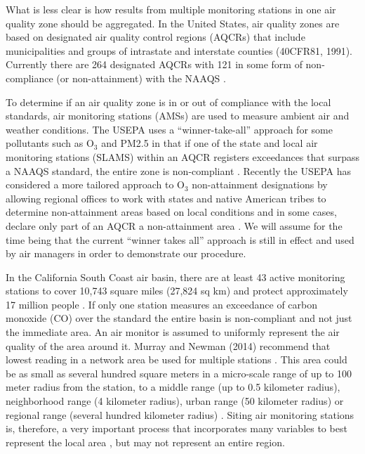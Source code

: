 What is less clear is how results from multiple monitoring stations in one air quality zone should be aggregated. In the United States, air quality zones are based on designated air quality control regions (AQCRs) that include municipalities and groups of intrastate and interstate counties (40CFR81, 1991). Currently there are 264 designated AQCRs with 121 in some form of non-compliance (or non-attainment) with the NAAQS \citep{USEPA2016b}. 

To determine if an air quality zone is in or out of compliance with the local standards, air monitoring stations (AMSs) are used to measure ambient air and weather conditions. The USEPA uses a ``winner-take-all” approach for some pollutants such as O$_{3}$ and PM2.5 in that if one of the state and local air monitoring stations (SLAMS) within an AQCR registers exceedances that surpass a NAAQS standard, the entire zone is non-compliant \citep{USEPA2005a}.  Recently the USEPA has considered a more tailored approach to O$_{3}$ non-attainment designations by allowing regional offices to work with states and native American tribes to determine non-attainment areas based on local conditions and in some cases, declare only part of an AQCR a non-attainment area \citep{McCabe2015}. We will assume for the time being that the current ``winner takes all” approach is still in effect and used by air managers in order to demonstrate our procedure.

In the California South Coast air basin, there are at least 43 active monitoring stations \citep{CARB2013} to cover 10,743 square miles (27,824 sq km) and protect approximately 17 million people \citep{AQMD2010}.  If only one station measures an exceedance of carbon monoxide (CO) over the standard the entire basin is non-compliant and not just the immediate area.  An air monitor is assumed to uniformly represent the air quality of the area around it.  Murray and Newman (2014) recommend that lowest reading in a network area be used for multiple stations \cite{Murray2014}. This area could be as small as several hundred square meters in a micro-scale range of up to 100 meter radius from the station, to a middle range (up to 0.5 kilometer radius), neighborhood range (4 kilometer radius), urban range (50 kilometer radius) or regional range (several hundred kilometer radius) \citep{Pan2009}.  Siting air monitoring stations is, therefore, a very important process that incorporates many variables to best represent the local area \citep{Bermudez2010}, but may not represent an entire region.

